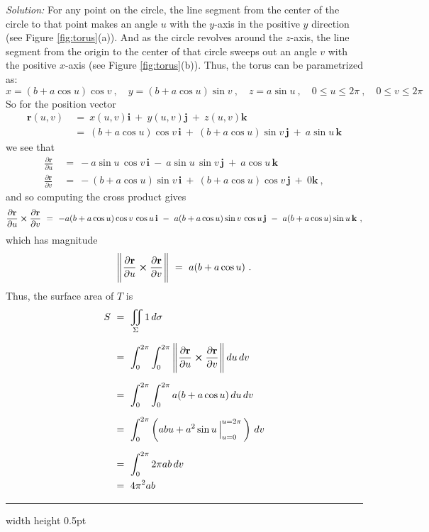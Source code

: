 \begin{exmp}
\par\noindent \emph{Solution:}
For any point on the circle, the line segment from the center of the circle to that point makes an angle $u$ with the
$y$-axis in the positive $y$ direction (see Figure \ref{fig:torus}(a)). And as the circle revolves around the $z$-axis,
the line segment from the origin to the center of that circle sweeps out an angle $v$ with the positive $x$-axis (see
Figure \ref{fig:torus}(b)). Thus, the torus can be parametrized as:
\begin{displaymath}
 x = (b+a\cos u)\cos v ~,\quad y = (b+a\cos u)\sin v ~,\quad z = a\sin u~,\quad 0\le u\le 2\pi~,\quad 0\le v\le 2\pi
\end{displaymath}
So for the position vector
\begin{align*}
 \mathbf{r}(u,v) ~&=~ x(u,v) \mathbf{i} ~+~ y(u,v) \mathbf{j} ~+~ z(u,v) \mathbf{k}\\
 &=~ (b+a\cos u)\cos v \,\mathbf{i} ~+~ (b+a\cos u)\sin v \,\mathbf{j} ~+~ a\sin u \,\mathbf{k}
\end{align*}
we see that
\begin{align*}
 \frac{\partial \mathbf{r}}{\partial u} ~&=~
  -a\sin u\,\cos v \,\mathbf{i} ~-~ a\sin u\,\sin v \,\mathbf{j} ~+~ a\cos u \,\mathbf{k}\\[6pt]
 \frac{\partial \mathbf{r}}{\partial v} ~&=~
  -(b+a\cos u)\sin v \,\mathbf{i} ~+~ (b+a\cos u)\cos v \,\mathbf{j} ~+~ 0 \mathbf{k} ~,
\end{align*}
and so computing the cross product gives
\begin{displaymath}
 \frac{\partial \mathbf{r}}{\partial u} \bm{\times} \frac{\partial \mathbf{r}}{\partial v} ~=~
  -a(b+a\cos u)\cos v\,\cos u \,\mathbf{i} ~-~ a(b+a\cos u)\sin v\,\cos u\,\mathbf{j} ~-~ a(b+a\cos u)\sin u \,\mathbf{k} ~,
\end{displaymath}
which has magnitude
\begin{displaymath}
 \Biggl\lVert\mspace{1mu}\frac{\partial \mathbf{r}}{\partial u} \bm{\times} \frac{\partial \mathbf{r}}{\partial v}\mspace{1mu}\Biggr\rVert ~=~ a(b+a\cos u) ~.
\end{displaymath}
Thus, the surface area of $T$ is
\begin{align*}
 S ~&=~ \iint\limits_{\Sigma} 1\,d\sigma\\[6pt]
  &=~ \int_0^{2\pi} \int_0^{2\pi}\,\Biggl\lVert\mspace{1mu}\frac{\partial \mathbf{r}}{\partial u} \bm{\times} \frac{\partial
  \mathbf{r}}{\partial v}\mspace{1mu}\Biggr\rVert\,du\,dv\\[6pt]
  &=~ \int_0^{2\pi} \int_0^{2\pi} a(b+a\cos u)\,du\,dv\\[6pt]
  &=~ \int_0^{2\pi} \left( abu + a^2 \sin u \,\Big|_{u=0}^{u=2\pi}\,\right)\,dv\\[6pt]
  &=~ \int_0^{2\pi} 2\pi ab\,dv\\
  &=~ 4\pi^2 ab
\end{align*}
\end{exmp}
\hrule width \textwidth height 0.5pt
\medskip

